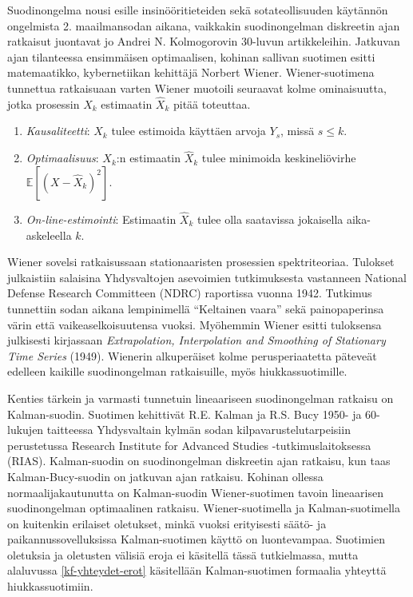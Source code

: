 \documentclass[
  12pt,
  a4paper, twoside]{book}
\begin{document}
Suodinongelma nousi esille insinööritieteiden sekä sotateollisuuden käytännön ongelmista 2. maailmansodan aikana, vaikkakin suodinongelman diskreetin ajan ratkaisut juontavat jo Andrei N. Kolmogorovin 30-luvun artikkeleihin. Jatkuvan ajan tilanteessa ensimmäisen optimaalisen, kohinan sallivan suotimen esitti matemaatikko, kybernetiikan kehittäjä Norbert Wiener. Wiener-suotimena tunnettua ratkaisuaan varten Wiener muotoili seuraavat kolme ominaisuutta, jotka prosessin \(X_k\) estimaatin \(\hat{X}_k\) pitää toteuttaa.

\begin{enumerate}
\vspace{\baselineskip}
\item \textit{Kausaliteetti}: $X_k$ tulee estimoida käyttäen arvoja $Y_s$, missä $s \leq k$.
\item \textit{Optimaalisuus}: $X_k$:n estimaatin $\hat{X}_k$ tulee minimoida keskineliövirhe $\mathbb{E}[(X-\hat{X}_k)^2]$.
\item \textit{On-line-estimointi}: Estimaatin $\hat{X}_k$ tulee olla saatavissa jokaisella aika-askeleella $k$. 
\vspace{\baselineskip}
\end{enumerate}

Wiener sovelsi ratkaisussaan stationaaristen prosessien spektriteoriaa. Tulokset julkaistiin salaisina Yhdysvaltojen asevoimien tutkimuksesta vastanneen National Defense Research Committeen (NDRC) raportissa vuonna 1942. Tutkimus tunnettiin sodan aikana lempinimellä ``Keltainen vaara'' sekä painopaperinsa värin että vaikeaselkoisuutensa vuoksi. Myöhemmin Wiener esitti tuloksensa julkisesti kirjassaan \textit{Extrapolation, Interpolation and Smoothing of Stationary Time Series} (1949). Wienerin alkuperäiset kolme perusperiaatetta päteveät edelleen kaikille suodinongelman ratkaisuille, myös hiukkassuotimille.

Kenties tärkein ja varmasti tunnetuin lineaariseen suodinongelman ratkaisu on Kalman-suodin. Suotimen kehittivät R.E. Kalman ja R.S. Bucy 1950- ja 60-lukujen taitteessa Yhdysvaltain kylmän sodan kilpavarustelutarpeisiin perustetussa Research Institute for Advanced Studies -tutkimuslaitoksessa (RIAS). Kalman-suodin on suodinongelman diskreetin ajan ratkaisu, kun taas Kalman-Bucy-suodin on jatkuvan ajan ratkaisu. Kohinan ollessa normaalijakautunutta on Kalman-suodin Wiener-suotimen tavoin lineaarisen suodinongelman optimaalinen ratkaisu. Wiener-suotimella ja Kalman-suotimella on kuitenkin erilaiset oletukset, minkä vuoksi erityisesti säätö- ja paikannussovelluksissa Kalman-suotimen käyttö on luontevampaa. Suotimien oletuksia ja oletusten välisiä eroja ei käsitellä tässä tutkielmassa, mutta alaluvussa \ref{kf-yhteydet-erot} käsitellään Kalman-suotimen formaalia yhteyttä hiukkassuotimiin.
\end{document}
